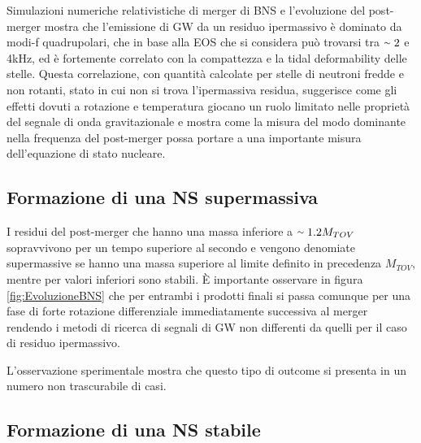 Simulazioni numeriche relativistiche di merger di BNS e l'evoluzione del post-merger mostra che l'emissione di GW da un residuo ipermassivo è dominato da modi-f quadrupolari, che in base alla EOS che si considera può trovarsi tra $\smallsim2$ e 4kHz, ed è fortemente correlato con la compattezza e la tidal deformability delle stelle. Questa correlazione, con quantità calcolate per stelle di neutroni fredde e non rotanti, stato in cui non si trova l'ipermassiva residua, suggerisce come gli effetti dovuti a rotazione e temperatura giocano un ruolo limitato nelle proprietà del segnale di onda gravitazionale e mostra come la misura del modo dominante nella frequenza del post-merger possa portare a una importante misura dell'equazione di stato nucleare\cite{sarin2020evolution}.

\subsection{Formazione di una NS supermassiva}
I residui del post-merger che hanno una massa inferiore a $\smallsim1.2M_{TOV}$ sopravvivono per un tempo superiore al secondo e vengono denomiate supermassive se hanno una massa superiore al limite definito in precedenza $M_{TOV}$, mentre per valori inferiori sono stabili.
È importante osservare in figura \ref{fig:EvoluzioneBNS} che per entrambi i prodotti finali si passa comunque per una fase di forte rotazione differenziale immediatamente successiva al merger rendendo i metodi di ricerca di segnali di GW non differenti da quelli per il caso di residuo ipermassivo.

L'osservazione sperimentale mostra che questo tipo di outcome si presenta in un numero non trascurabile di casi.
\subsection{Formazione di una NS stabile}
